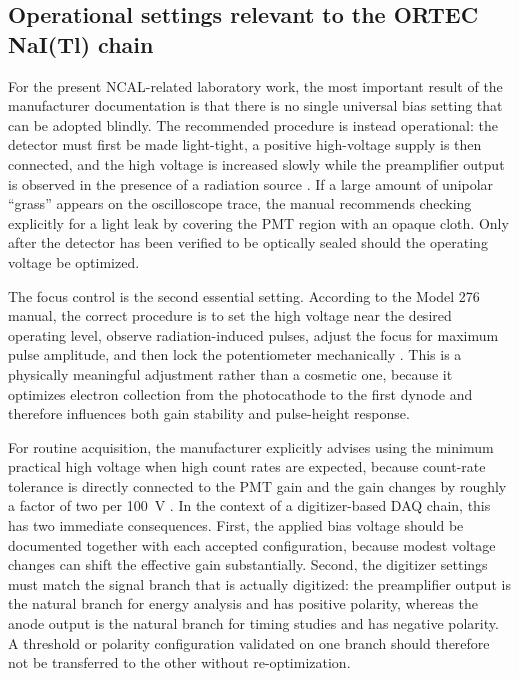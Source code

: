 \subsection{Operational settings relevant to the ORTEC NaI(Tl) chain}

For the present NCAL-related laboratory work, the most important result of the manufacturer documentation is that there is no single universal bias setting that can be adopted blindly. The recommended procedure is instead operational: the detector must first be made light-tight, a positive high-voltage supply is then connected, and the high voltage is increased slowly while the preamplifier output is observed in the presence of a radiation source \citep{ORTEC276Manual}. If a large amount of unipolar ``grass'' appears on the oscilloscope trace, the manual recommends checking explicitly for a light leak by covering the PMT region with an opaque cloth. Only after the detector has been verified to be optically sealed should the operating voltage be optimized.

The focus control is the second essential setting. According to the Model 276 manual, the correct procedure is to set the high voltage near the desired operating level, observe radiation-induced pulses, adjust the focus for maximum pulse amplitude, and then lock the potentiometer mechanically \citep{ORTEC276Manual}. This is a physically meaningful adjustment rather than a cosmetic one, because it optimizes electron collection from the photocathode to the first dynode and therefore influences both gain stability and pulse-height response.

For routine acquisition, the manufacturer explicitly advises using the minimum practical high voltage when high count rates are expected, because count-rate tolerance is directly connected to the PMT gain and the gain changes by roughly a factor of two per \SI{100}{V} \citep{ORTEC276Manual}. In the context of a digitizer-based DAQ chain, this has two immediate consequences. First, the applied bias voltage should be documented together with each accepted configuration, because modest voltage changes can shift the effective gain substantially. Second, the digitizer settings must match the signal branch that is actually digitized: the preamplifier output is the natural branch for energy analysis and has positive polarity, whereas the anode output is the natural branch for timing studies and has negative polarity. A threshold or polarity configuration validated on one branch should therefore not be transferred to the other without re-optimization.

